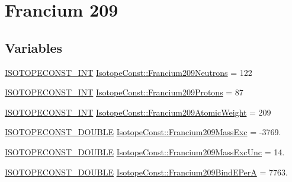 \hypertarget{group___isotope_const-_francium-_fr209}{}\section{Francium 209}
\label{group___isotope_const-_francium-_fr209}
\subsection*{Variables}
\begin{DoxyCompactItemize}
\item 
\mbox{\hyperlink{group___isotope_const-_macros_ga5f18360b3e99483a35c32d789e62621c}{I\+S\+O\+T\+O\+P\+E\+C\+O\+N\+S\+T\+\_\+\+I\+NT}} \mbox{\hyperlink{group___isotope_const-_francium-_fr209_ga0d3ca68c744687aa2be04fc7b8cb03d6}{Isotope\+Const\+::\+Francium209\+Neutrons}} = 122
\item 
\mbox{\hyperlink{group___isotope_const-_macros_ga5f18360b3e99483a35c32d789e62621c}{I\+S\+O\+T\+O\+P\+E\+C\+O\+N\+S\+T\+\_\+\+I\+NT}} \mbox{\hyperlink{group___isotope_const-_francium-_fr209_ga11655cf45c08a853a74e09ca5162feb9}{Isotope\+Const\+::\+Francium209\+Protons}} = 87
\item 
\mbox{\hyperlink{group___isotope_const-_macros_ga5f18360b3e99483a35c32d789e62621c}{I\+S\+O\+T\+O\+P\+E\+C\+O\+N\+S\+T\+\_\+\+I\+NT}} \mbox{\hyperlink{group___isotope_const-_francium-_fr209_ga84ac2569f6d4e128136e7bf2ea6361ab}{Isotope\+Const\+::\+Francium209\+Atomic\+Weight}} = 209
\item 
\mbox{\hyperlink{group___isotope_const-_macros_ga8f45a7272ce02c0b4c65c44636ed719a}{I\+S\+O\+T\+O\+P\+E\+C\+O\+N\+S\+T\+\_\+\+D\+O\+U\+B\+LE}} \mbox{\hyperlink{group___isotope_const-_francium-_fr209_ga155d8421fab30246543cfd4aa741fe16}{Isotope\+Const\+::\+Francium209\+Mass\+Exc}} = -\/3769.
\item 
\mbox{\hyperlink{group___isotope_const-_macros_ga8f45a7272ce02c0b4c65c44636ed719a}{I\+S\+O\+T\+O\+P\+E\+C\+O\+N\+S\+T\+\_\+\+D\+O\+U\+B\+LE}} \mbox{\hyperlink{group___isotope_const-_francium-_fr209_ga051a91470846f703bb310546c4f1cee6}{Isotope\+Const\+::\+Francium209\+Mass\+Exc\+Unc}} = 14.
\item 
\mbox{\hyperlink{group___isotope_const-_macros_ga8f45a7272ce02c0b4c65c44636ed719a}{I\+S\+O\+T\+O\+P\+E\+C\+O\+N\+S\+T\+\_\+\+D\+O\+U\+B\+LE}} \mbox{\hyperlink{group___isotope_const-_francium-_fr209_ga30cf844ed82d362c5bae97e239a30ecd}{Isotope\+Const\+::\+Francium209\+Bind\+E\+PerA}} = 7763.
\item 

\end{DoxyCompactItemize}
